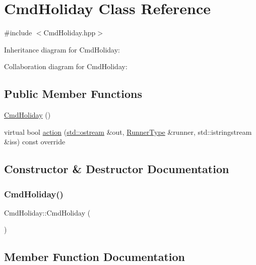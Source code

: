 \hypertarget{classCmdHoliday}{}\section{Cmd\+Holiday Class Reference}
\label{classCmdHoliday}


{\ttfamily \#include $<$Cmd\+Holiday.\+hpp$>$}



Inheritance diagram for Cmd\+Holiday\+:


Collaboration diagram for Cmd\+Holiday\+:
\subsection*{Public Member Functions}
\begin{DoxyCompactItemize}
\item 
\hyperlink{classCmdHoliday_aa2eb6480f535d82377c022d268e1a31e}{Cmd\+Holiday} ()
\item 
virtual bool \hyperlink{classCmdHoliday_adaaed1d04098dde0bfa8b3d6c3d322e1}{action} (\hyperlink{doctest_8h_a116af65cb5e924b33ad9d9ecd7a783f3}{std\+::ostream} \&out, \hyperlink{Command_8hpp_ad45c3de597c2023a8be0399d914161f4}{Runner\+Type} \&runner, std\+::istringstream \&iss) const override
\end{DoxyCompactItemize}


\subsection{Constructor \& Destructor Documentation}
\mbox{\label{classCmdHoliday_aa2eb6480f535d82377c022d268e1a31e}} 
\subsubsection{\texorpdfstring{Cmd\+Holiday()}{CmdHoliday()}}
{\footnotesize\ttfamily Cmd\+Holiday\+::\+Cmd\+Holiday (\begin{DoxyParamCaption}{ }\end{DoxyParamCaption})}



\subsection{Member Function Documentation}
\mbox{\label{classCmdHoliday_adaaed1d04098dde0bfa8b3d6c3d322e1}} 
